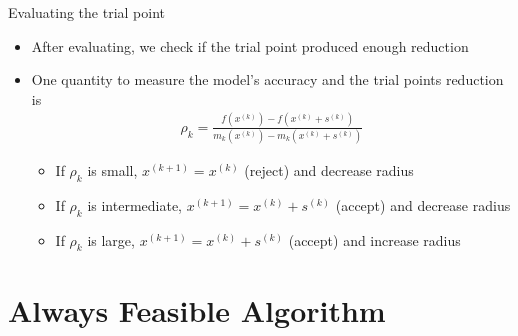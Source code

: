\documentclass{beamer}
\newcommand{\xk}{{{x}^{(k)}}}
\begin{document}


\begin{frame}{Evaluating the trial point}
	\begin{itemize}
		\item After evaluating, we check if the trial point produced enough reduction
		\item One quantity to measure the model's accuracy and the trial points reduction is
\begin{align*}
	\rho_k = \frac{f\left(\xk\right) - f\left(\xk+s^{(k)}\right)}
		{m_k\left(\xk\right) - m_k\left(\xk+s^{(k)}\right)}
\end{align*}
		\begin{itemize}
			\item If $\rho_k$ is small, $x^{(k+1)}=\xk$ (reject) and decrease radius
			\item If $\rho_k$ is intermediate, $x^{(k+1)}=\xk+s^{(k)}$ (accept) and decrease radius
			\item If $\rho_k$ is large, $x^{(k+1)}=\xk+s^{(k)}$ (accept) and increase radius
		\end{itemize}
	\end{itemize}
\end{frame}


\section{Always Feasible Algorithm}
\end{document}
